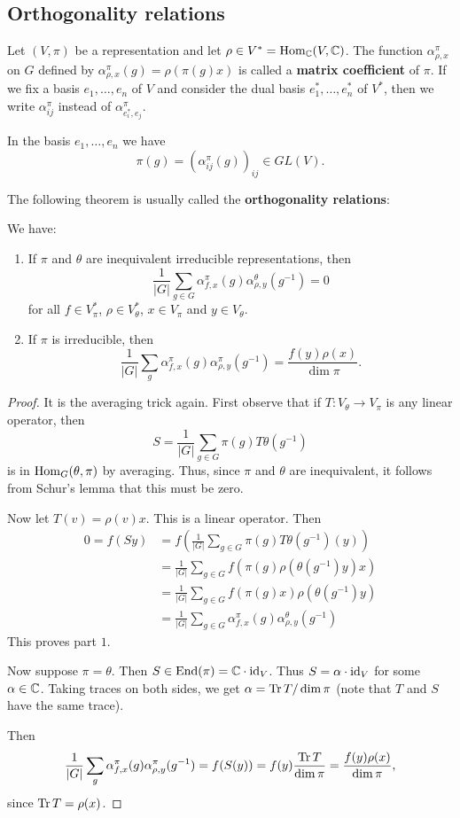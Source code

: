 \documentclass[11pt, english]{article}
\begin{document}
\subsection{Orthogonality relations}

Let $(V,\pi)$ be a representation and let $\rho \in V^\ast = \operatorname{Hom}_{\mathbb{C}}(V,\mathbb{C})$. The function $\alpha_{\rho,x}^\pi$ on $G$ defined by $\alpha_{\rho,x}^\pi(g)=\rho(\pi(g)x)$ is called a \textbf{matrix coefficient} of $\pi$. If we fix a basis $e_1,\ldots,e_n$ of $V$ and consider the dual basis $e_1^\ast,\ldots, e_n^\ast$ of $V^\ast$, then we write $\alpha_{ij}^\pi$ instead of $\alpha_{e_i^\ast,e_j}^\pi$.

In the basis $e_1,\ldots,e_n$ we have
$$
\pi(g) = \left( \alpha_{ij}^\pi(g) \right)_{ij} \in GL(V).
$$

The following theorem is usually called the \textbf{orthogonality relations}:
\begin{thm}
 We have:
 \begin{enumerate}
 \item If $\pi$ and $\theta$ are inequivalent irreducible representations, then
\[
\frac 1{\lvert G \rvert} \sum_{g \in G} \alpha_{f,x}^\pi(g) \alpha_{\rho,y}^\theta(g^{-1}) = 0
\]
for all $f \in V_\pi^\ast$, $\rho \in V_\theta^\ast$, $x \in V_\pi$ and $y \in V_\theta$.
\item If $\pi$ is irreducible, then
\[
\frac{1}{\lvert G \rvert} \sum_g \alpha_{f,x}^\pi(g) \alpha_{\rho,y}^\pi (g^{-1}) = \frac{f(y) \rho(x)}{\dim \pi}.
\]
 \end{enumerate}
\end{thm}
\begin{proof}
It is the averaging trick again. First observe that if $T:V_\theta \to V_\pi$ is any linear operator, then 
\[
S = \frac{1}{\lvert G \rvert} \sum_{g \in G} \pi(g) T \theta(g^{-1}) 
\]
is in $\operatorname{Hom}_G(\theta,\pi)$ by averaging. Thus, since $\pi$ and $\theta$ are inequivalent, it follows from Schur's lemma that this must be zero.

Now let $T(v) = \rho(v)x$. This is a linear operator. Then
\begin{align*}
0 = f(Sy) &= f\left( \frac{1}{\lvert G \rvert} \sum_{g \in G} \pi(g) T \theta(g^{-1})(y) \right) \\
&= \frac{1}{\lvert G \rvert} \sum_{g \in G} f(\pi(g)\rho(\theta(g^{-1})y)x) \\
&= \frac{1}{\lvert G \rvert} \sum_{g \in G} f(\pi(g)x) \rho(\theta(g^{-1})y) \\
&= \frac{1}{\lvert G \rvert} \sum_{g \in G} \alpha_{f,x}^\pi (g) \alpha_{\rho,y}^\theta (g^{-1})
\end{align*}
This proves part $1$.

Now suppose $\pi=\theta$. Then $S \in \operatorname{End}(\pi) = \mathbb{C} \cdot \text{id}_V$. Thus $S = \alpha \cdot \text{id}_V$ for some $\alpha \in \mathbb{C}$. Taking traces on both sides, we get $\alpha = \operatorname{Tr} T/\dim \pi$ (note that $T$ and $S$ have the same trace).

Then
$$
\frac 1{\lvert G \rvert} \sum_g \alpha_{f,x}^\pi(g) \alpha_{\rho,y}^\pi(g^{-1}) = f(S(y)) = f(y) \frac{\operatorname{Tr} T}{\dim \pi} = \frac{f(y)\rho(x)}{\dim \pi},
$$
since $\operatorname{Tr} T = \rho(x)$. 
\end{proof}
\end{document}
